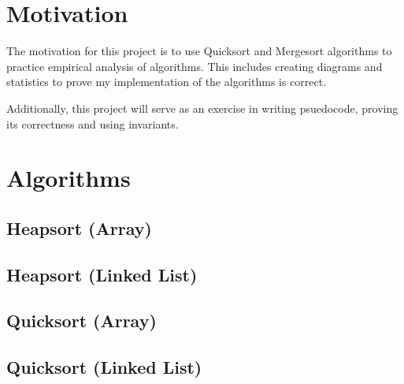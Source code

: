 \documentclass[a4paper,12pt]{article}
\begin{document}
\section{Motivation}

The motivation for this project is to use Quicksort and Mergesort algorithms to practice empirical analysis of algorithms.
This includes creating diagrams and statistics to prove my implementation of the algorithms is correct.

Additionally, this project will serve as an exercise in writing psuedocode, proving its correctness and using invariants.

\section{Algorithms}
\subsection{Heapsort (Array)}
\subsection{Heapsort (Linked List)}
\subsection{Quicksort (Array)}
\subsection{Quicksort (Linked List)}
\end{document}
